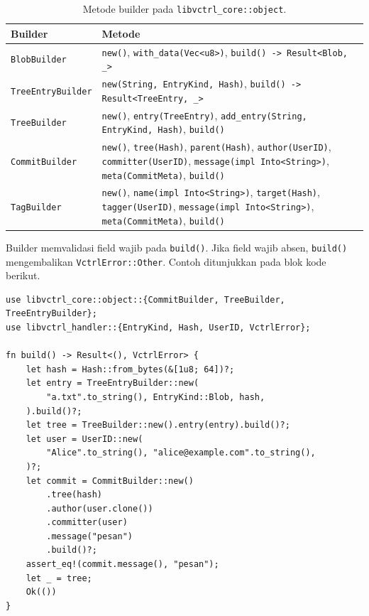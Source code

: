 \documentclass[11pt,a4paper]{article}
\begin{document}
\begin{table}[H]
	\centering
	\caption{Metode builder pada \texttt{libvctrl\_core::object}.}
	\label{tab:builder}
	\footnotesize
	\begin{tabularx}{\textwidth}{l X}
		\toprule
		Builder & Metode \\
		\midrule
		\texttt{BlobBuilder} & \texttt{new()}, \texttt{with\_data(Vec<u8>)}, \texttt{build() -> Result<Blob, \_>} \\
		\texttt{TreeEntryBuilder} & \texttt{new(String, EntryKind, Hash)}, \texttt{build() -> Result<TreeEntry, \_>} \\
		\texttt{TreeBuilder} & \texttt{new()}, \texttt{entry(TreeEntry)}, \texttt{add\_entry(String, EntryKind, Hash)}, \texttt{build()} \\
		\texttt{CommitBuilder} & \texttt{new()}, \texttt{tree(Hash)}, \texttt{parent(Hash)}, \texttt{author(UserID)}, \texttt{committer(UserID)}, \texttt{message(impl Into<String>)}, \texttt{meta(CommitMeta)}, \texttt{build()} \\
		\texttt{TagBuilder} & \texttt{new()}, \texttt{name(impl Into<String>)}, \texttt{target(Hash)}, \texttt{tagger(UserID)}, \texttt{message(impl Into<String>)}, \texttt{meta(CommitMeta)}, \texttt{build()} \\
		\bottomrule
	\end{tabularx}
\end{table}

Builder memvalidasi field wajib pada \texttt{build()}. Jika field wajib absen, \texttt{build()} mengembalikan \texttt{VctrlError::Other}. Contoh ditunjukkan pada blok kode berikut.

\begin{lstlisting}[style=code]
use libvctrl_core::object::{CommitBuilder, TreeBuilder, TreeEntryBuilder};
use libvctrl_handler::{EntryKind, Hash, UserID, VctrlError};

fn build() -> Result<(), VctrlError> {
    let hash = Hash::from_bytes(&[1u8; 64])?;
    let entry = TreeEntryBuilder::new(
        "a.txt".to_string(), EntryKind::Blob, hash,
    ).build()?;
    let tree = TreeBuilder::new().entry(entry).build()?;
    let user = UserID::new(
        "Alice".to_string(), "alice@example.com".to_string(),
    )?;
    let commit = CommitBuilder::new()
        .tree(hash)
        .author(user.clone())
        .committer(user)
        .message("pesan")
        .build()?;
    assert_eq!(commit.message(), "pesan");
    let _ = tree;
    Ok(())
}
\end{lstlisting}
\end{document}
